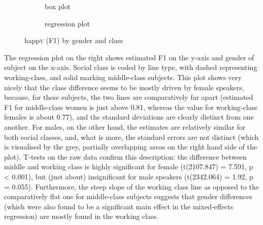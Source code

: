 	\begin{figure}
		
		\begin{subfigure}{.49\textwidth}
			
			\resizebox{\linewidth}{!}{} 
			\caption{box plot}
			\label{fig.box.f1w.happy.genderclass}
		\end{subfigure}
		\begin{subfigure}{.49\textwidth}
			
			\resizebox{\linewidth}{!}{}
			\caption{regression plot}
			\label{fig.scatter.f1w.happy.genderclass}
		\end{subfigure}
		\caption{happ\textsc{y} (F1) by gender and class}
	\end{figure}

The regression plot on the right shows estimated F1 on the y-axis and gender of subject on the x-axis.
Social class is coded by line type, with dashed representing working-class, and solid marking middle-class subjects.
This plot shows very nicely that the class difference seems to be mostly driven by female speakers, because, for these subjects, the two lines are comparatively far apart (estimated F1 for middle-class women is just above 0.81, whereas the value for working-class females is about 0.77), and the standard deviations are clearly distinct from one another.
For males, on the other hand, the estimates are relatively similar for both social classes, and, what is more, the standard errors are not distinct (which is visualised by the grey, partially overlapping areas on the right hand side of the plot).
T-tests on the raw data confirm this description: the difference between middle and working class is highly significant for female (t(2107.847) = 7.591, p < 0.001), but (just about) insignificant for male speakers (t(2342.064) = 1.92, p = 0.055).
Furthermore, the steep slope of the working class line as opposed to the comparatively flat one for middle-class subjects suggests that gender differences (which were also found to be a significant main effect in the mixed-effects regression) are mostly found in the working class.

